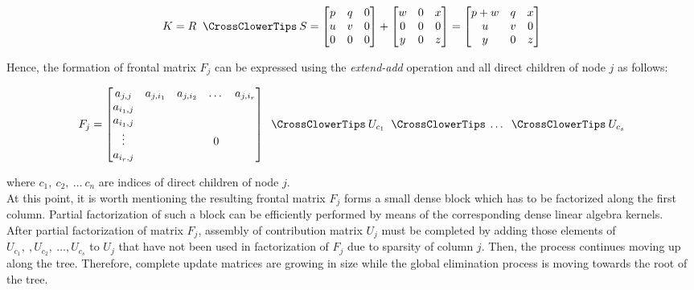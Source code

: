 \begin{equation} \label{eq:mm-8}
K = R \extendadd S = \begin{bmatrix}
p & q & 0 \\
u & v & 0 \\
0 & 0 & 0 \\
\end{bmatrix} 
+
\begin{bmatrix}
w & 0 & x \\
0 & 0 & 0 \\
y & 0 & z \\
\end{bmatrix} 
=
\begin{bmatrix}
p + w & q & x \\
u & v & 0 \\
y & 0 & z \\
\end{bmatrix} 
\end{equation}

Hence, the formation of frontal matrix $F_{j}$ can be expressed using the \textit{extend-add} operation and all direct children of node $j$ as follows:


\begin{equation} \label{eq:mm-9}
	F_{j} = \begin{bmatrix}a_{j,j} & a_{j,i_1} & a_{j,i_2} & \dots & a_{j,i_r} \\
a_{i_1,j} \\
a_{i_1,j} \\
\vdots & & & 0\\
a_{i_r,j} \\
\end{bmatrix} \extendadd U_{c_1} \extendadd \dots \extendadd U_{c_s} 
\end{equation}

where $c_{1}, \: c_{2}, \: \dots \: c_{n}$ are indices of direct children of node $j$.\\

At this point, it is worth mentioning the resulting frontal matrix $F_{j}$ forms a small dense block which has to be factorized along the first column. Partial factorization of such a block can be efficiently performed by means of the corresponding dense linear algebra kernels.\\


After partial factorization of matrix $F_{j}$, assembly of contribution matrix $U_{j}$ must be completed by adding those elements of $U_{c_1}, \:, U_{c_2}, \: \dots, U_{c_s}$ to $U_{j}$ that have not been used in factorization of $F_{j}$ due to sparsity of column $j$. Then, the process continues moving up along the tree. Therefore, complete update matrices are growing in size while the global elimination process is moving towards the root of the tree.\\


